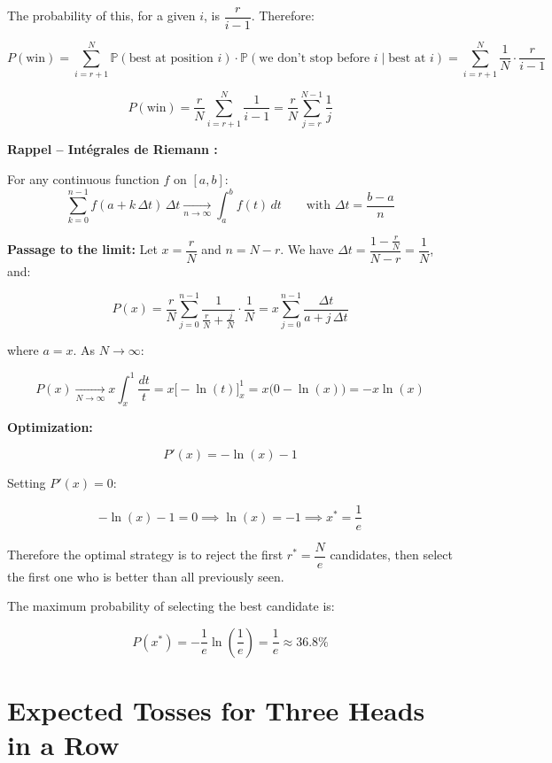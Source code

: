 The probability of this, for a given $i$, is $\dfrac{r}{i-1}$. Therefore:

\[
P(\text{win}) = \sum_{i=r+1}^{N} \mathbb{P}(\text{best at position } i) \cdot \mathbb{P}(\text{we don't stop before } i \mid \text{best at } i) = \sum_{i=r+1}^{N} \frac{1}{N} \cdot \frac{r}{i-1}
\]

\[
P(\text{win}) = \frac{r}{N} \sum_{i=r+1}^{N} \frac{1}{i-1} = \frac{r}{N} \sum_{j=r}^{N-1} \frac{1}{j}
\]

\bigskip

\textbf{Rappel -- Intégrales de Riemann :}

For any continuous function $f$ on $[a,b]$:
\[
\sum_{k=0}^{n-1} f(a + k\,\Delta t)\,\Delta t \xrightarrow[n \to \infty]{} \int_a^b f(t)\,dt \qquad \text{with } \Delta t = \frac{b-a}{n}
\]

\bigskip

\textbf{Passage to the limit:} Let $x = \dfrac{r}{N}$ and $n = N - r$. We have $\Delta t = \dfrac{1 - \frac{r}{N}}{N - r} = \dfrac{1}{N}$, and:

\[
P(x) = \frac{r}{N} \sum_{j=0}^{n-1} \frac{1}{\frac{r}{N} + \frac{j}{N}} \cdot \frac{1}{N} = x \sum_{j=0}^{n-1} \frac{\Delta t}{a + j\,\Delta t}
\]

where $a = x$. As $N \to \infty$:

\[
P(x) \xrightarrow[N \to \infty]{} x \int_x^1 \frac{dt}{t} = x \Big[-\ln(t)\Big]_x^1 = x\big(0 - \ln(x)\big) = -x\ln(x)
\]

\bigskip

\textbf{Optimization:}

\[
P'(x) = -\ln(x) - 1
\]

Setting $P'(x) = 0$:

\[
-\ln(x) - 1 = 0 \implies \ln(x) = -1 \implies \boxed{x^* = \frac{1}{e}}
\]

Therefore the optimal strategy is to reject the first $r^* = \dfrac{N}{e}$ candidates, then select the first one who is better than all previously seen.

\bigskip

The maximum probability of selecting the best candidate is:

\[
P(x^*) = -\frac{1}{e}\ln\left(\frac{1}{e}\right) = \frac{1}{e} \approx \boxed{36.8\%}
\]


\section{Expected Tosses for Three Heads in a Row}

